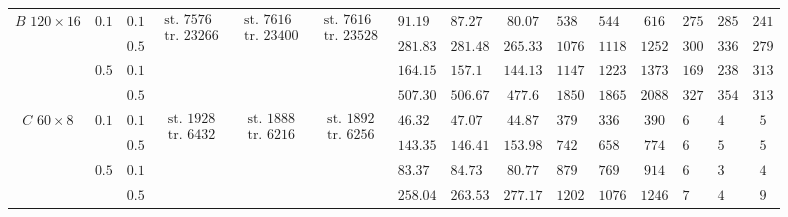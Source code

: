\begin{table}[t]
{\begin{tabular}{|c|c|c|c|c|c|g|h|c|g|h|c|g|h|c|}
       &  & $0.1$ &  &   &   & $91.19$ & $87.27$ & $80.07$ & $538$ & $544$ & $616$ & $275$ & $285$ & $241$\\ \hhline{|~|~|-|~|~|~|-|-|-|-|-|-|}
       & & $0.5$ & & & & $281.83$ & $281.48$ & $265.33$ & $1076$ & $1118$ & $1252$ & $300$ & $336$ & $279$\\ \hhline{|~|-|-|~|~|~|-|-|-|-|-|-|-|-|-|}
       &  & $0.1$ & & & & $164.15$ & $157.1$ & $144.13$ & $1147$ & $1223$ & $1373$ & $169$ & $238$ & $313$\\ \hhline{|~|~|-|~|~|~|-|-|-|-|-|-|-|-|-|}
       & & $0.5$ & & & & $507.30$ & $506.67$ & $477.6$ & $1850$ & $1865$ & $2088$ & $327$ & $354$ & $313$\\ \hline

       &  & $0.1$ &  &   &   & $46.32$ & $47.07$ & $44.87$ & $379$ & $336$ & $390$ & $6$ & $4$ & $5$\\ \hhline{|~|~|-|~|~|~|-|-|-|-|-|-|-|-|-|}
       & & $0.5$ & & & & $143.35$ & $146.41$ & $153.98$ & $742$ & $658$ & $774$ & $6$ & $5$ & $5$\\ \hhline{|~|-|-|~|~|~|-|-|-|-|-|-|-|-|-|}
       &  & $0.1$ & & & & $83.37$ & $84.73$ & $80.77$ & $879$ & $769$ & $914$ & $6$ & $3$ & $4$\\ \hhline{|~|~|-|~|~|~|-|-|-|-|-|-|-|-|-|}
       & & $0.5$ & & & & $258.04$ & $263.53$ & $277.17$ & $1202$ & $1076$ & $1246$ & $7$ & $4$ & $9$\\ \hline


\end{tabular}}
\end{table}
